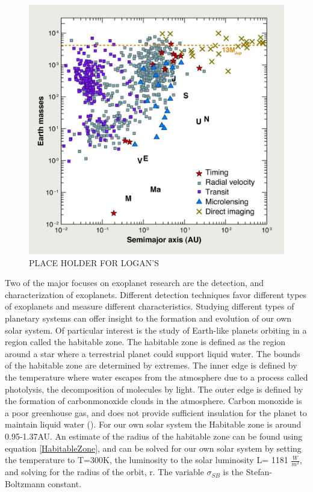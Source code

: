 \begin{figure}
    \centering
    \includegraphics{Chapter Materials/Introduction Materials/Introduction Figures/F1.large.jpg}
    \caption{PLACE HOLDER FOR LOGAN'S}
    \label{fig:exoplanets}
\end{figure}

Two of the major focuses on exoplanet research are the detection, and characterization of exoplanets. Different detection techniques favor different types of exoplanets and measure different characteristics. Studying different types of planetary systems can offer insight to the formation and evolution of our own solar system. Of particular interest is the study of Earth-like planets orbiting in a region called the habitable zone. The habitable zone is defined as the region around a star where a terrestrial planet could support liquid water. The bounds of the habitable zone are determined by extremes. The inner edge is defined by the temperature where water escapes from the atmosphere due to a process called photolysis, the decomposition of molecules by light. The outer edge is defined by the formation of carbonmonoxide clouds in the atmosphere. Carbon monoxide is a poor greenhouse gas, and does not provide sufficient insulation for the planet to maintain liquid water (\cite{seager2010exoplanets}). For our own solar system the Habitable zone is around 0.95-1.37AU. An estimate of the radius of the habitable zone can be found using equation \ref{HabitableZone}, and can be solved for our own solar system by setting the temperature to T=300K, the luminosity to the solar luminosity L= 1181 $\frac{W}{m^2}$, and solving for the radius of the orbit, r. The variable $\sigma_{SB}$ is the Stefan-Boltzmann constant. 


